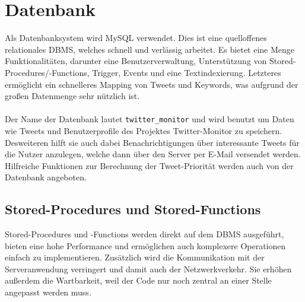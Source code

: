 \section{Datenbank}

Als Datenbanksystem wird MySQL verwendet. Dies ist eine quelloffenes relationales \ac{DBMS}, welches schnell und verlässig arbeitet. Es bietet eine Menge Funktionalitäten, darunter eine Benutzerverwaltung, Unterstützung von Stored-Procedures/-Functions, Trigger, Events und eine Textindexierung. Letzteres ermöglicht ein schnelleres Mapping von Tweets und Keywords, was aufgrund der großen Datenmenge sehr nützlich ist.
\\\\
Der Name der Datenbank lautet \texttt{twitter\_monitor} und wird benutzt um Daten wie Tweets und 
Benutzerprofile des Projektes Twitter-Monitor zu speichern. Desweiteren hilft sie auch dabei 
Benachrichtigungen über interessante Tweets für die Nutzer anzulegen, welche dann über den Server 
per E-Mail versendet werden. Hilfreiche Funktionen zur Berechnung der Tweet-Priorität werden auch
von der Datenbank angeboten. 

\subsection{Stored-Procedures und Stored-Functions}

Stored-Procedures und -Functions werden direkt auf dem \acs{DBMS} ausgeführt, bieten eine hohe Performance und ermöglichen auch komplexere Operationen einfach zu implementieren. Zusätzlich wird die Kommunikation mit der Serveranwendung verringert und damit auch der Netzwerkverkehr. Sie erhöhen außerdem die Wartbarkeit, weil der Code nur noch zentral an einer Stelle angepasst werden muss.

